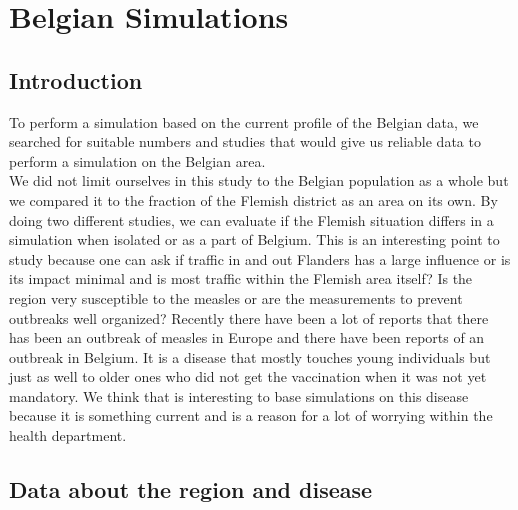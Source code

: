 \documentclass[runningheads]{llncs}
\begin{document}
	\newpage
	
	\section{Belgian Simulations}
	\subsection{Introduction}
	To perform a simulation based on the current profile of the Belgian data, we searched for suitable numbers and studies that would give us reliable data to perform a simulation on the Belgian area.\\
	We did not limit ourselves in this study to the Belgian population as a whole but we compared it to the fraction of the Flemish district as an area on its own.
	By doing two different studies, we can evaluate if the Flemish situation differs in a simulation when isolated or as a part of Belgium.
	\noindent
	This is an interesting point to study because one can ask if traffic in and out Flanders has a large influence or is its impact minimal and is most traffic within the Flemish area itself? Is the region very susceptible to the measles or are the measurements to prevent outbreaks well organized?
	\noindent
	Recently there have been a lot of reports that there has been an outbreak of measles in Europe and there have been reports of an outbreak in Belgium. It is a disease that mostly touches young individuals but just as well to older ones who did not get the vaccination when it was not yet mandatory. We think that is interesting to base simulations on this disease because it is something current and is a reason for a lot of worrying within the health department.
	
	\subsection{Data about the region and disease}
	
\end{document}
